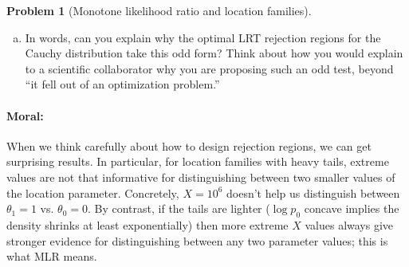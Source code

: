 \documentclass{article}
\theoremstyle{definition}
\newtheorem{problem}{Problem}
\begin{document}
\begin{problem}[Monotone likelihood ratio and location families]
\begin{enumerate}[(a)]
\item In words, can you explain why the optimal LRT rejection regions for the Cauchy distribution take this odd form? Think about how you would explain to a scientific collaborator why you are proposing such an odd test, beyond ``it fell out of an optimization problem.''



\end{enumerate}

\paragraph{Moral:} When we think carefully about how to design rejection regions, we can get surprising results. In particular, for location families with heavy tails, extreme values are not that informative for distinguishing between two smaller values of the location parameter. Concretely, $X=10^6$ doesn't help us distinguish between $\theta_1=1$ vs. $\theta_0=0$. By contrast, if the tails are lighter ($\log p_0$ concave implies the density shrinks at least exponentially) then more extreme $X$ values always give stronger evidence for distinguishing between any two parameter values; this is what MLR means.
\end{problem}
\end{document}
